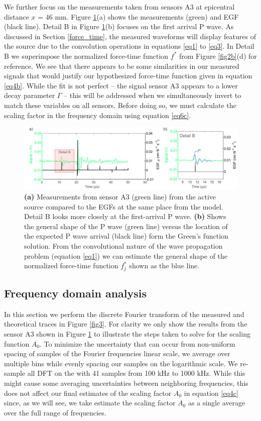 \documentclass[preprint,3p, 11pt,authoryear]{elsarticle}
\begin{document}
{We further focus on the measurements taken from sensors A3 at epicentral distance $x$ = 46 mm. Figure \ref{fig5}(a) shows the measurements (green) and EGF (black line).  Detail B in Figure \ref{fig5}(b) focuses on the first arrival P wave. As discussed in Section \ref{force_time}, the measured waveforms will display features of the source due to the convolution operations in equations \eqref{eq1} to \eqref{eq3}. In Detail B we superimpose the normalized force-time function $f^{*}$ from Figure \ref{fig2b}(d) for reference. We see that there appears to be some similarities in our measured signals that would justify our hypothesized force-time function given in equation \eqref{eq4b}.  While the fit is not perfect -- the signal sensor A3 appears to a lower decay parameter $\Gamma$ -- this will be addressed when we simultaneously invert to match these variables on all sensors. Before doing so, we must calculate the scaling factor in the frequency domain using equation \eqref{eq6c}.


\begin{figure}[ht]
     	\centering
\includegraphics[scale= 0.85]{FIG5.pdf} 
\caption{\textbf{(a)} Measurements from sensor A3 (green line) from the active source compared to the EGFs at the same place from the model.  Detail B looks more closely at the first-arrival P wave. \textbf{(b)} Shows the general shape of the P wave (green line) versus the location of the expected P wave arrival (black line) form the Green's function solution.  From the convolutional nature of the wave propagation problem (equation \eqref{eq1}) we can estimate the general shape of the normalized force-time function $f^{*}_{j}$ shown as the blue line.}
	\label{fig5} 
\end{figure}

\subsection{Frequency domain analysis}
In this section we perform the discrete Fourier transform of the measured and theoretical traces in Figure \ref{fig3}.  For clarity we only show the results from the sensor A3 shown in Figure \ref{fig5} to illustrate the steps taken to solve for the scaling function $A_{0}$. To minimize the uncertainty that can occur from non-uniform spacing of samples of the Fourier frequencies linear scale, we average over multiple bins while evenly spacing our samples on the logarithmic scale.  We re-sample all DFT on the with 41 samples from 100 kHz to 1000 kHz.  While this might cause some averaging uncertainties between neighboring frequencies, this does not affect our final estimates of the scaling factor  $A_{0}$ in equation \eqref{eq4c} since, as we will see, we take estimate the scaling factor $A_{0}$ as a single average over the full range of frequencies. 

}
\end{document}
